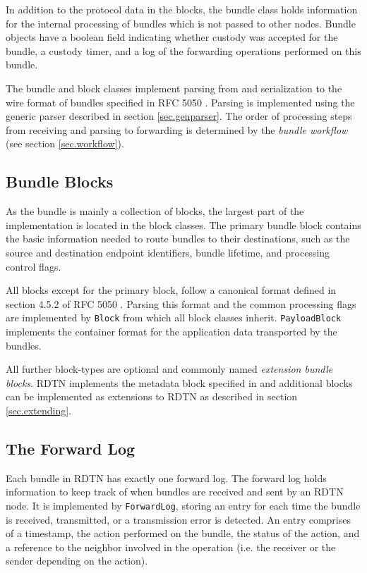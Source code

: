 \documentclass[a4paper]{article}
\begin{document}
In addition to the protocol data in the blocks, the bundle class holds
information for the internal processing of bundles which is not passed to other
nodes.  Bundle objects have a boolean field indicating whether custody was
accepted for the bundle, a custody timer, and a log of the forwarding operations
performed on this bundle.

The bundle and block classes implement parsing from and serialization to the
wire format of bundles specified in RFC 5050 \cite{bundle-spec}. Parsing is
implemented using the generic parser described in section \ref{sec.genparser}.
The order of processing steps from receiving and parsing to forwarding is
determined by the {\em bundle workflow} (see section \ref{sec.workflow}).

\subsection{Bundle Blocks}\label{sec.bundle-blocks}

As the bundle is mainly a collection of blocks, the largest part of the
implementation is located in the block classes. The primary bundle block
contains the basic information needed to route bundles to their destinations,
such as the source and destination endpoint identifiers, bundle lifetime, and
processing control flags. 

All blocks except for the primary block, follow a canonical format defined in
section 4.5.2 of RFC 5050 \cite{bundle-spec}. Parsing this format and the common
processing flags are implemented by {\tt Block} from which all block classes
inherit.  {\tt PayloadBlock} implements the container format for the application
data transported by the bundles.

All further block-types are optional and commonly named {\em extension bundle
blocks}. RDTN implements the metadata block specified in \cite{metadata-block}
and additional blocks can be implemented as extensions to RDTN as described in
section \ref{sec.extending}.

\subsection{The Forward Log}\label{sec.forward-log}

Each bundle in RDTN has exactly one forward log. The forward log holds
information to keep track of when bundles are received and sent by an RDTN node.
It is implemented by {\tt ForwardLog}, storing an entry for each time the bundle
is received, transmitted, or a transmission error is detected. An entry
comprises of a timestamp, the action performed on the bundle, the status of the
action, and a reference to the neighbor involved in the operation (i.e. the
receiver or the sender depending on the action).
\end{document}
